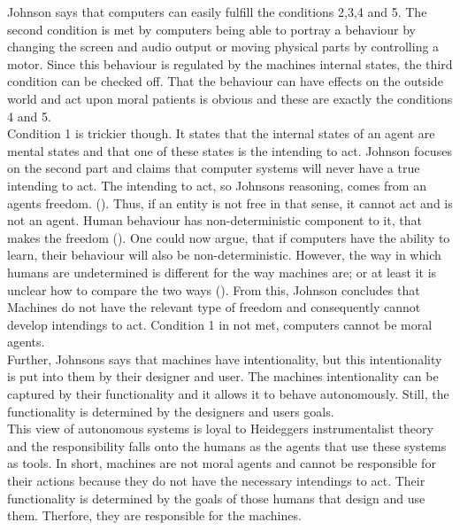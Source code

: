 \documentclass{article}
\begin{document}
Johnson says that computers can easily fulfill the conditions 2,3,4 and 5. The
second condition is met by computers being able to portray a behaviour by
changing the screen and audio output or moving physical parts by controlling a
motor. Since this behaviour is regulated by the machines internal states, the
third condition can be checked off. That the behaviour can have effects on the
outside world and act upon moral patients is obvious and these are exactly the
conditions 4 and 5.\\
Condition 1 is trickier though. It states that the internal states of an agent
are mental states and that one of these states is the intending to act. Johnson
focuses on the second part and claims that computer systems will never have a
true intending to act. The intending to act, so Johnsons reasoning, comes from
an agents freedom.  (\cite[p. 198]{johnson2006computer}). Thus, if an
entity is not free in that sense, it cannot act and is not an agent. Human
behaviour has non-deterministic component to it, that  makes
the freedom (\cite[p. 198]{johnson2006computer}). One could now argue, that if
computers have the ability to learn, their behaviour will also be
non-deterministic. However, the way in which humans are undetermined is
different for the way machines are; or at least it is unclear how to compare the
two ways (\cite[p. 198]{johnson2006computer}). From this, Johnson concludes that
Machines do not have the relevant type of freedom and consequently cannot
develop intendings to act. Condition 1 in not met, computers cannot be moral
agents.\\
Further, Johnsons says that machines have intentionality, but this
intentionality is put into them by their designer and user. The machines
intentionality can be captured by their functionality and it allows it to behave
autonomously. Still, the functionality is determined by the designers and users
goals.\\
This view of autonomous systems is loyal to Heideggers instrumentalist theory
and the responsibility falls onto the humans as the agents that use these
systems as tools.
In short, machines are not moral agents and cannot be responsible for their
actions because they do not have the necessary intendings to act. Their
functionality is determined by the goals of those humans that design and use
them. Therfore, they are responsible for the machines.
\end{document}
